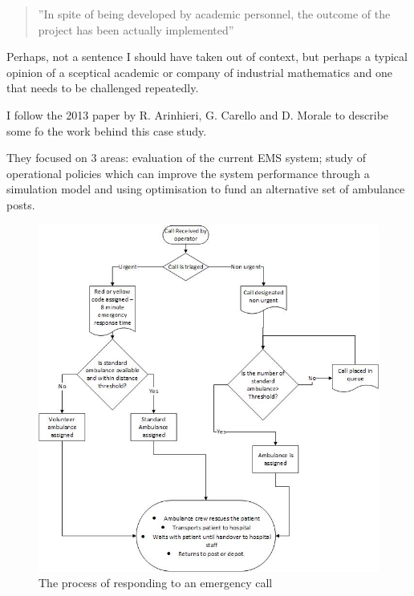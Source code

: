 \documentclass[11pt]{article} %
\begin{document}
	\begin{quote}
		''In spite of being developed by academic personnel, the outcome of the project has been actually implemented''
	\end{quote}

	Perhaps, not a sentence I should have taken out of context, but perhaps a typical  opinion of a sceptical academic or company of industrial mathematics and one that needs to be challenged repeatedly. 
	
	

	I follow the 2013 paper by R. Arinhieri, G. Carello and D. Morale \cite{Carello2013}  to describe some fo the work behind this case study.
	
	They focused on 3 areas: evaluation of the current EMS system; study of operational policies which can improve the system performance through a simulation model and using optimisation to fund an alternative set of ambulance posts. 
	\begin{figure}
		\centering
		\includegraphics[width=\linewidth]{Report_images/MilanEMS}
		\caption{The process of responding to an emergency call}
		\label{fig:milanems}
	\end{figure}
\end{document}
